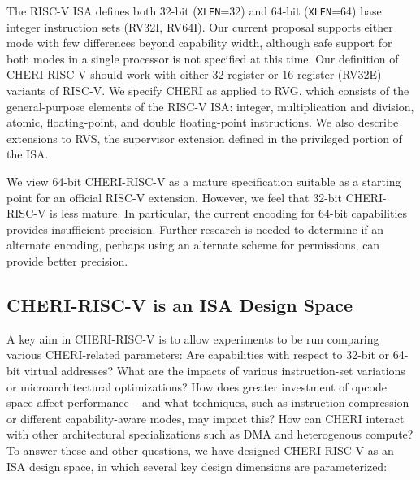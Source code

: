 The RISC-V ISA defines both 32-bit (\texttt{XLEN}=32) and 64-bit
(\texttt{XLEN}=64) base integer instruction
sets (RV32I, RV64I). 
Our current proposal supports either mode with few differences beyond
capability width, although safe support for both modes in a single processor
is not specified at this time.
Our definition of CHERI-RISC-V should work with either 32-register or
16-register (RV32E) variants of RISC-V.
We specify CHERI as applied to RVG, which consists of the general-purpose
elements of the RISC-V ISA: integer, multiplication and division,
atomic, floating-point, and double floating-point instructions.
We also describe extensions to RVS, the supervisor extension defined in the
privileged portion of the ISA.

We view 64-bit CHERI-RISC-V as a mature specification suitable as a
starting point for an official RISC-V extension.  However, we feel
that 32-bit CHERI-RISC-V is less mature.  In particular, the current
encoding for 64-bit capabilities provides insufficient precision.
Further research is needed to determine if an alternate encoding,
perhaps using an alternate scheme for permissions, can provide better
precision.

\subsection{CHERI-RISC-V is an ISA Design Space}

A key aim in CHERI-RISC-V is to allow experiments to be run comparing various
CHERI-related parameters:  Are capabilities with respect to 32-bit or
64-bit virtual addresses?  What are the impacts of various instruction-set
variations or microarchitectural optimizations?  How does greater investment
of opcode space affect performance -- and what techniques, such as instruction
compression or different capability-aware modes, may impact this?  How can
CHERI interact with other architectural specializations such as DMA and
heterogenous compute?
To answer these and other questions, we have designed CHERI-RISC-V as an ISA
design space, in which several key design dimensions are parameterized:

